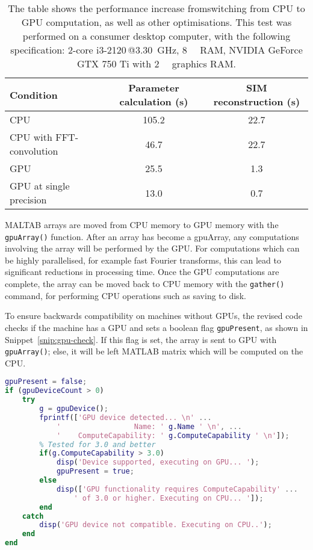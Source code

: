 \begin{table}[h!]
\caption[SROS-SIM reconstruction is 32X faster on the GPU than the CPU]{\label{tab:reconPerformance}The table shows the performance increase fromswitching from CPU to GPU computation, as well as other optimisations. This test was performed on a consumer desktop computer, with the following specification: 2-core i3-2120\,@\SI{3.30}{\giga\hertz}, \SI{8}{\giga\byte} RAM, NVIDIA GeForce GTX 750 Ti with \SI{2}{\giga\byte} graphics RAM.}
\centering
\begin{tabular}{|l|c|c|}
\hline
\textbf{Condition} & \textbf{Parameter calculation (s)} & \textbf{SIM reconstruction (s)} \\ \hline
CPU & 105.2 & 22.7 \\
CPU with FFT-convolution & 46.7 & 22.7 \\
GPU & 25.5 & 1.3 \\
GPU at single precision & 13.0 & 0.7 \\
\hline

\end{tabular}
\end{table}

MALTAB arrays are moved from CPU memory to GPU memory with the \texttt{gpuArray()} function. 
After an array has become a gpuArray, any computations involving the array will be performed by the GPU. 
For computations which can be highly parallelised, for example fast Fourier transforms, this can lead to significant reductions in processing time. 
Once the GPU computations are complete, the array can be moved back to CPU memory with the \texttt{gather()} command, for performing CPU operations such as saving to disk. 

To ensure backwards compatibility on machines without GPUs, the revised code checks if the machine has a GPU and sets a boolean flag \texttt{gpuPresent}, as shown in Snippet~\ref{snip:gpu-check}. 
If this flag is set, the array is sent to GPU with \texttt{gpuArray()}; else, it will be left MATLAB matrix which will be computed on the CPU. 

\begin{lstfloat}
\begin{lstlisting}[language=matlab,caption={A check must be performed at the start of the main program to detect if a suitable graphics card is installed for GPU computation},label={snip:gpu-check},frame=single]
gpuPresent = false; 
if (gpuDeviceCount > 0) 
    try
        g = gpuDevice();
        fprintf(['GPU device detected... \n' ...
            '                 Name: ' g.Name ' \n', ...
            '    ComputeCapability: ' g.ComputeCapability ' \n']);
        % Tested for 3.0 and better
        if(g.ComputeCapability > 3.0)
            disp('Device supported, executing on GPU... '); 
            gpuPresent = true; 
        else
            disp(['GPU functionality requires ComputeCapability' ...
                ' of 3.0 or higher. Executing on CPU... ']); 
        end
    catch
        disp('GPU device not compatible. Executing on CPU..');
    end
end
\end{lstlisting}
\end{lstfloat}



